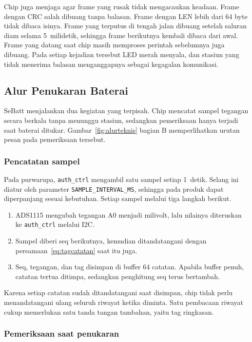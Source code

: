 \documentclass[11pt,a4paper]{article}
\begin{document}
Chip juga menjaga agar frame yang rusak tidak mengacaukan keadaan. Frame dengan CRC salah dibuang
tanpa balasan. Frame dengan LEN lebih dari 64 byte tidak dibaca isinya. Frame yang terputus di
tengah jalan dibuang setelah saluran diam selama 5~milidetik, sehingga frame berikutnya kembali
dibaca dari awal. Frame yang datang saat chip masih memproses perintah sebelumnya juga dibuang.
Pada setiap kejadian tersebut LED merah menyala, dan stasiun yang tidak menerima balasan
menganggapnya sebagai kegagalan komunikasi.

\subsection{Alur Penukaran Baterai}
\label{subsec:alur}

SeBatt menjalankan dua kegiatan yang terpisah. Chip mencatat sampel tegangan secara berkala
tanpa menunggu stasiun, sedangkan pemeriksaan hanya terjadi saat baterai ditukar.
Gambar~\ref{fig:alurteknis} bagian B memperlihatkan urutan pesan pada pemeriksaan tersebut.

\subsubsection*{Pencatatan sampel}

Pada purwarupa, \texttt{auth\_ctrl} mengambil satu sampel setiap 1~detik. Selang ini diatur oleh
parameter \texttt{SAMPLE\_INTERVAL\_MS}, sehingga pada produk dapat diperpanjang sesuai kebutuhan.
Setiap sampel melalui tiga langkah berikut.
\begin{enumerate}
  \item ADS1115 mengubah tegangan A0 menjadi milivolt, lalu nilainya diteruskan ke
    \texttt{auth\_ctrl} melalui I2C.
  \item Sampel diberi seq berikutnya, kemudian ditandatangani dengan
    persamaan~\eqref{eq:tagcatatan} saat itu juga.
  \item Seq, tegangan, dan tag disimpan di buffer 64 catatan. Apabila buffer penuh, catatan
    tertua ditimpa, sedangkan penghitung seq terus bertambah.
\end{enumerate}
Karena setiap catatan sudah ditandatangani saat disimpan, chip tidak perlu menandatangani ulang
seluruh riwayat ketika diminta. Satu pembacaan riwayat cukup memerlukan satu tanda tangan
tambahan, yaitu tag ringkasan.

\subsubsection*{Pemeriksaan saat penukaran}
\end{document}
